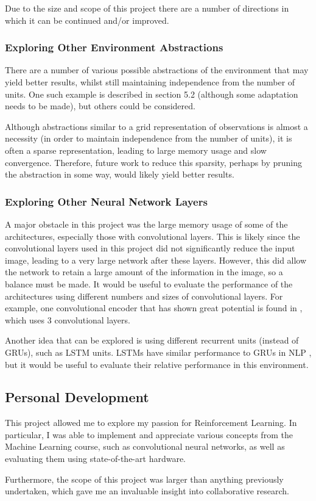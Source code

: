 Due to the size and scope of this project there are a number of directions in which it can be continued and/or improved. 





\subsubsection{Exploring Other Environment Abstractions}

There are a number of various possible abstractions of the environment that may yield better results, whilst still maintaining independence from the number of units. One such example is described in section 5.2 (although some adaptation needs to be made), but others could be considered. 

Although abstractions similar to a grid representation of observations is almost a necessity (in order to maintain independence from the number of units), it is often a sparse representation, leading to large memory usage and slow convergence. Therefore, future work to reduce this sparsity, perhaps by pruning the abstraction in some way, would likely yield better results.

\subsubsection{Exploring Other Neural Network Layers}

A major obstacle in this project was the large memory usage of some of the architectures, especially those with convolutional layers. This is likely since the convolutional layers used in this project did not significantly reduce the input image, leading to a very large network after these layers. However, this did allow the network to retain a large amount of the information in the image, so a balance must be made. It would be useful to evaluate the performance of the architectures using different numbers and sizes of convolutional layers. For example, one convolutional encoder that has shown great potential is found in \cite{natureencoder}, which uses 3 convolutional layers.

Another idea that can be explored is using different recurrent units (instead of GRUs), such as LSTM units. LSTMs have similar performance to GRUs in NLP \cite{lstmvsgru}, but it would be useful to evaluate their relative performance in this environment. 

\subsection{Personal Development}
This project allowed me to explore my passion for Reinforcement Learning. In particular, I was able to implement and appreciate various concepts from the Machine Learning course, such as convolutional neural networks, as well as evaluating them using state-of-the-art hardware.

Furthermore, the scope of this project was larger than anything previously undertaken, which gave me an invaluable insight into collaborative research.